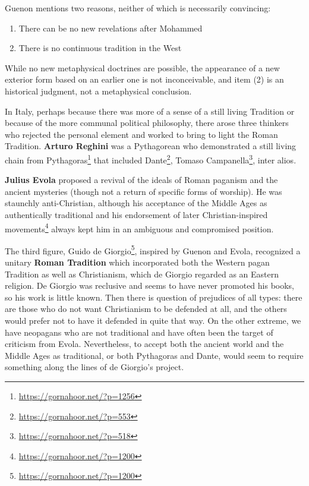 Guenon mentions two reasons, neither of which is necessarily convincing:

\begin{enumerate}
\item There can be no new revelations after Mohammed

\item There is no continuous tradition in the West
\end{enumerate}


While no new metaphysical doctrines are possible, the appearance of a new exterior form based on an earlier one is not inconceivable, and item (2) is an historical judgment, not a metaphysical conclusion.

In Italy, perhaps because there was more of a sense of a still living Tradition or because of the more communal political philosophy, there arose three thinkers who rejected the personal element and worked to bring to light the Roman Tradition. \textbf{Arturo Reghini} was a Pythagorean who demonstrated a still living chain from Pythagoras\footnote{\url{https://gornahoor.net/?p=1256}} that included Dante\footnote{\url{https://gornahoor.net/?p=553}}, Tomaso Campanella\footnote{\url{https://gornahoor.net/?p=518}}, inter alios.

\textbf{Julius Evola} proposed a revival of the ideals of Roman paganism and the ancient mysteries (though not a return of specific forms of worship). He was staunchly anti-Christian, although his acceptance of the Middle Ages as authentically traditional and his endorsement of later Christian-inspired movements\footnote{\url{https://gornahoor.net/?p=1200}} always kept him in an ambiguous and compromised position.

The third figure, Guido de Giorgio\footnote{\url{https://gornahoor.net/?p=1200}}, inspired by Guenon and Evola, recognized a unitary \textbf{Roman Tradition} which incorporated both the Western pagan Tradition as well as Christianism, which de Giorgio regarded as an Eastern religion. De Giorgio was reclusive and seems to have never promoted his books, so his work is little known. Then there is question of prejudices of all types: there are those who do not want Christianism to be defended at all, and the others would prefer not to have it defended in quite that way. On the other extreme, we have neopagans who are not traditional and have often been the target of criticism from Evola. Nevertheless, to accept both the ancient world and the Middle Ages as traditional, or both Pythagoras and Dante, would seem to require something along the lines of de Giorgio's project.

